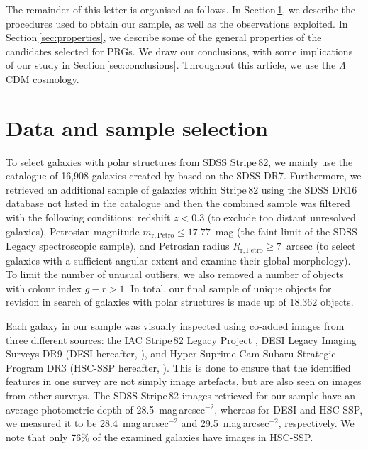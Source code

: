 \documentclass[letter]{aa}
\begin{document}
The remainder of this letter is organised as follows. In Section\,\ref{sec:data}, we describe the procedures used to obtain our sample, as well as the observations exploited.
In Section\,\ref{sec:properties}, we describe some of the general properties of the candidates selected for PRGs. We draw our conclusions, with some implications of our study in Section\,\ref{sec:conclusions}. Throughout this article, we use the \citet{2020A&A...641A...6P} $\Lambda$CDM
cosmology.


\section{Data and sample selection}
\label{sec:data}
To select galaxies with polar structures from SDSS Stripe\,82, we mainly use the catalogue of 16,908 galaxies created by \citet{2019MNRAS.486..390B} based on the SDSS DR7. Furthermore, we retrieved an additional sample of galaxies within Stripe\,82 using the SDSS DR16 \citep{2020ApJS..249....3A} database not listed in the \citet{2019MNRAS.486..390B} catalogue and then the combined sample was filtered with the following conditions: redshift $z<0.3$ (to exclude too distant unresolved galaxies), Petrosian magnitude $m_\mathrm{r,Petro}\leq17.77$~mag (the faint limit of the SDSS Legacy spectroscopic sample), and Petrosian radius $R_\mathrm{r,Petro} \geq 7$~arcsec (to select  galaxies with a sufficient angular extent and examine their global morphology).
To limit the number of unusual outliers, we also removed a number of objects with colour index $g-r > 1$.
In total, our final sample of unique objects for revision in search of galaxies with polar structures is made up of 18,362 objects.

Each galaxy in our sample was visually inspected using co-added images from three different sources: the IAC Stripe\,82 Legacy Project \citep{2016MNRAS.456.1359F}, DESI Legacy Imaging Surveys DR9 (DESI hereafter, \citealt{2019AJ....157..168D}), and Hyper Suprime-Cam Subaru Strategic Program DR3 (HSC-SSP hereafter, \citealt{2022PASJ...74..247A}). This is done to ensure that the identified features in one survey are not simply image artefacts, but are also seen on images from other surveys.
The SDSS Stripe\,82 images retrieved for our sample have an average photometric depth of 28.5~mag\,arcsec$^{-2}$, whereas for DESI and HSC-SSP, we measured it to be 28.4~mag\,arcsec$^{-2}$ and 29.5~mag\,arcsec$^{-2}$, respectively. We note that only 76\% of the examined galaxies have images in HSC-SSP.
\end{document}
